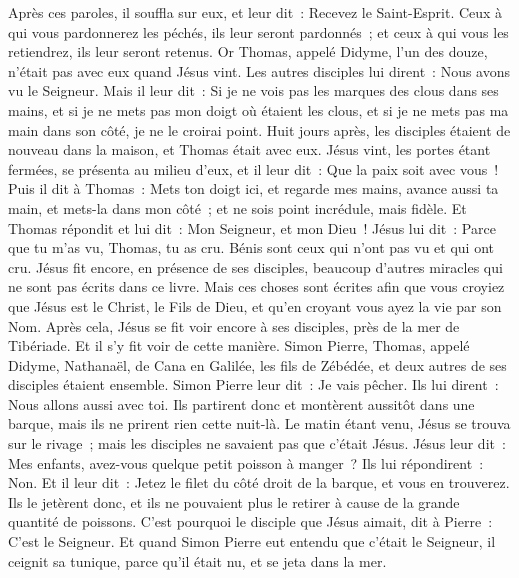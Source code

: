 \begin{multicols}{2}
Après ces paroles, il souffla sur eux, et leur dit~: Recevez le Saint-Esprit.
Ceux à qui vous pardonnerez les péchés, ils leur seront pardonnés~; et ceux à qui vous les retiendrez, ils leur seront retenus.
Or Thomas, appelé Didyme, l'un des douze, n'était pas avec eux quand Jésus vint.
Les autres disciples lui dirent~: Nous avons vu le Seigneur. Mais il leur dit~: Si je ne vois pas les marques des clous dans ses mains, et si je ne mets pas mon doigt où étaient les clous, et si je ne mets pas ma main dans son côté, je ne le croirai point.
Huit jours après, les disciples étaient de nouveau dans la maison, et Thomas était avec eux. Jésus vint, les portes étant fermées, se présenta au milieu d'eux, et il leur dit~: Que la paix soit avec vous~!
Puis il dit à Thomas~: Mets ton doigt ici, et regarde mes mains, avance aussi ta main, et mets-la dans mon côté~; et ne sois point incrédule, mais fidèle.
Et Thomas répondit et lui dit~: Mon Seigneur, et mon Dieu~!
Jésus lui dit~: Parce que tu m'as vu, Thomas, tu as cru. Bénis sont ceux qui n'ont pas vu et qui ont cru.
Jésus fit encore, en présence de ses disciples, beaucoup d'autres miracles qui ne sont pas écrits dans ce livre.
Mais ces choses sont écrites afin que vous croyiez que Jésus est le Christ, le Fils de Dieu, et qu'en croyant vous ayez la vie par son Nom.
\VerseOne{}Après cela, Jésus se fit voir encore à ses disciples, près de la mer de Tibériade. Et il s'y fit voir de cette manière.
Simon Pierre, Thomas, appelé Didyme, Nathanaël, de Cana en Galilée, les fils de Zébédée, et deux autres de ses disciples étaient ensemble.
Simon Pierre leur dit~: Je vais pêcher. Ils lui dirent~: Nous allons aussi avec toi. Ils partirent donc et montèrent aussitôt dans une barque, mais ils ne prirent rien cette nuit-là.
Le matin étant venu, Jésus se trouva sur le rivage~; mais les disciples ne savaient pas que c'était Jésus.
Jésus leur dit~: Mes enfants, avez-vous quelque petit poisson à manger~? Ils lui répondirent~: Non.
Et il leur dit~: Jetez le filet du côté droit de la barque, et vous en trouverez. Ils le jetèrent donc, et ils ne pouvaient plus le retirer à cause de la grande quantité de poissons.
C'est pourquoi le disciple que Jésus aimait, dit à Pierre~: C'est le Seigneur. Et quand Simon Pierre eut entendu que c'était le Seigneur, il ceignit sa tunique, parce qu'il était nu, et se jeta dans la mer.

\end{multicols}
